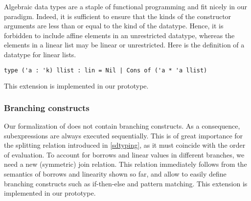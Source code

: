 Algebraic data types are a staple of functional programming and fit nicely
in our paradigm. Indeed, it is sufficient to ensure  that the kinds of
the constructor arguments are less than or equal to the kind of the datatype.
Hence, it is forbidden to include affine elements in an unrestricted
datatype, whereas the elements in a linear list may be linear or
unrestricted. 
Here is the definition of a datatype for linear lists.

\begin{lstlisting}
type ('a : 'k) llist : lin = Nil | Cons of ('a * 'a llist)
\end{lstlisting}

This extension is implemented in our prototype.

\subsubsection{Branching constructs}

Our formalization of \lang does not contain branching constructs. As a consequence,
subexpressions are always executed sequentially. This is of great importance
for the splitting relation introduced in \cref{sdtyping}, as it must
coincide with the order of evaluation. To account for borrows and linear
values in different branches, we need a new (symmetric) join relation.
This relation immediately follows from the semantics of borrows and linearity
shown so far, and allow to easily define branching constructs such as if-then-else
and pattern matching.
This extension is implemented in our prototype.

\lstDeleteShortInline@

